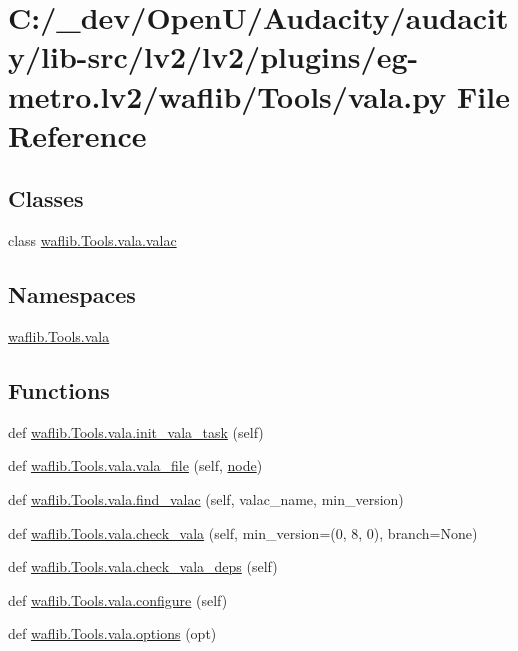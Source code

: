 \hypertarget{lv2_2plugins_2eg-metro_8lv2_2waflib_2_tools_2vala_8py}{}\section{C\+:/\+\_\+dev/\+Open\+U/\+Audacity/audacity/lib-\/src/lv2/lv2/plugins/eg-\/metro.lv2/waflib/\+Tools/vala.py File Reference}
\label{lv2_2plugins_2eg-metro_8lv2_2waflib_2_tools_2vala_8py}
\subsection*{Classes}
\begin{DoxyCompactItemize}
\item 
class \hyperlink{classwaflib_1_1_tools_1_1vala_1_1valac}{waflib.\+Tools.\+vala.\+valac}
\end{DoxyCompactItemize}
\subsection*{Namespaces}
\begin{DoxyCompactItemize}
\item 
 \hyperlink{namespacewaflib_1_1_tools_1_1vala}{waflib.\+Tools.\+vala}
\end{DoxyCompactItemize}
\subsection*{Functions}
\begin{DoxyCompactItemize}
\item 
def \hyperlink{namespacewaflib_1_1_tools_1_1vala_afedcf657dff8a988abdf3f52dc1b1584}{waflib.\+Tools.\+vala.\+init\+\_\+vala\+\_\+task} (self)
\item 
def \hyperlink{namespacewaflib_1_1_tools_1_1vala_a6baf611b698503ed4c43e8ff2e870acd}{waflib.\+Tools.\+vala.\+vala\+\_\+file} (self, \hyperlink{structnode}{node})
\item 
def \hyperlink{namespacewaflib_1_1_tools_1_1vala_afcb54ec67c0f38a26b8cf34ae9c89b7b}{waflib.\+Tools.\+vala.\+find\+\_\+valac} (self, valac\+\_\+name, min\+\_\+version)
\item 
def \hyperlink{namespacewaflib_1_1_tools_1_1vala_a3093897181665808445ee213a19a6d64}{waflib.\+Tools.\+vala.\+check\+\_\+vala} (self, min\+\_\+version=(0, 8, 0), branch=None)
\item 
def \hyperlink{namespacewaflib_1_1_tools_1_1vala_a0e50168b039627d93b07929537af57af}{waflib.\+Tools.\+vala.\+check\+\_\+vala\+\_\+deps} (self)
\item 
def \hyperlink{namespacewaflib_1_1_tools_1_1vala_aa13ac0bb84782b53e5cf4761adb55657}{waflib.\+Tools.\+vala.\+configure} (self)
\item 
def \hyperlink{namespacewaflib_1_1_tools_1_1vala_a17771e1da92206049384a4fea5523b78}{waflib.\+Tools.\+vala.\+options} (opt)
\end{DoxyCompactItemize}
